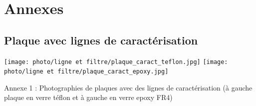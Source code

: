 \documentclass[french]{article}
\begin{document}
\newpage
\cite{cours_MF} \cite{cours_HF} \cite{data_fr4} \cite{data_PTFE}
{}

\newpage

\section*{Annexes}

\subsection*{Plaque avec lignes de caractérisation}
\texttt{[image: photo/ligne et filtre/plaque\_caract\_teflon.jpg]}
\texttt{[image: photo/ligne et filtre/plaque\_caract\_epoxy.jpg]}
\begin{center}
	Annexe 1 : Photographies de plaques avec des lignes de caractérisation (à gauche plaque en verre téflon et à gauche en verre epoxy FR4)
\end{center}
\end{document}
